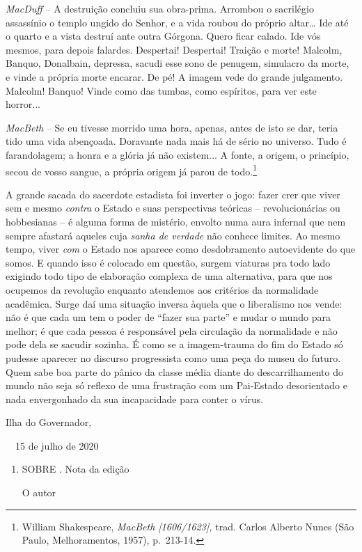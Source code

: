 \emph{MacDuff} -- A destruição concluiu sua obra-prima. Arrombou o
sacrilégio assassínio o templo ungido do Senhor, e a vida roubou do
próprio altar\ldots{} Ide até o quarto e a vista destruí ante outra
Górgona. Quero ficar calado. Ide vós mesmos, para depois falardes.
Despertai! Despertai! Traição e morte! Malcolm, Banquo, Donalbain,
depressa, sacudi esse sono de penugem, simulacro da morte, e vinde a
própria morte encarar. De pé! A imagem vede do grande julgamento.
Malcolm! Banquo! Vinde como das tumbas, como espíritos, para ver este
horror...~

\emph{MacBeth} -- Se eu tivesse morrido uma hora, apenas, antes de isto
se dar, teria tido uma vida abençoada. Doravante nada mais há de sério
no universo. Tudo é farandolagem; a honra e a glória já não existem... A
fonte, a origem, o princípio, secou de vosso sangue, a própria origem já
parou de todo.\footnote{William Shakespeare, \emph{MacBeth
  {[}1606/1623{]},} trad. Carlos Alberto Nunes (São Paulo,
  Melhoramentos, 1957), p.~213-14.}

A grande sacada do sacerdote estadista foi inverter o jogo: fazer crer
que viver sem e mesmo \emph{contra} o Estado e suas perspectivas
teóricas -- revolucionárias ou hobbesianas -- é alguma forma de
mistério, envolto numa aura infernal que nem sempre afastará aqueles
cuja \emph{sanha de verdade} não conhece limites. Ao mesmo tempo, viver
\emph{com} o Estado nos aparece como desdobramento autoevidente do que
somos. E quando isso é colocado em questão, surgem viaturas pra todo
lado exigindo todo tipo de elaboração complexa de uma alternativa, para
que nos ocupemos da revolução enquanto atendemos aos critérios da
normalidade acadêmica. Surge daí uma situação inversa àquela que o
liberalismo nos vende: não é que cada um tem o poder de ``fazer sua
parte'' e mudar o mundo para melhor; é que cada pessoa é responsável
pela circulação da normalidade e não pode dela se sacudir sozinha. É
como se a imagem-trauma do fim do Estado só pudesse aparecer no discurso
progressista como uma peça do museu do futuro. Quem sabe boa parte do
pânico da classe média diante do descarrilhamento do mundo não seja só
reflexo de uma frustração com um Pai-Estado desorientado e nada
envergonhado da sua incapacidade para conter o vírus.

Ilha do Governador,

~~15 de julho de 2020

\begin{enumerate}
\def\labelenumi{\arabic{enumi}.}
\setcounter{enumi}{7}
\item
  SOBRE . Nota da edição

  O autor
\end{enumerate}

